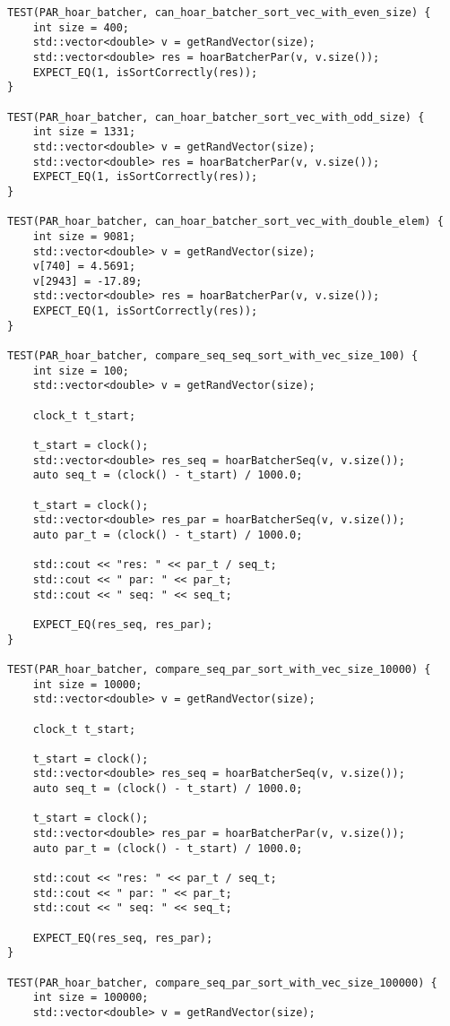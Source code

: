 \documentclass{report}
\begin{document}
\begin{lstlisting}
TEST(PAR_hoar_batcher, can_hoar_batcher_sort_vec_with_even_size) {
    int size = 400;
    std::vector<double> v = getRandVector(size);
    std::vector<double> res = hoarBatcherPar(v, v.size());
    EXPECT_EQ(1, isSortCorrectly(res));
}

TEST(PAR_hoar_batcher, can_hoar_batcher_sort_vec_with_odd_size) {
    int size = 1331;
    std::vector<double> v = getRandVector(size);
    std::vector<double> res = hoarBatcherPar(v, v.size());
    EXPECT_EQ(1, isSortCorrectly(res));
}

TEST(PAR_hoar_batcher, can_hoar_batcher_sort_vec_with_double_elem) {
    int size = 9081;
    std::vector<double> v = getRandVector(size);
    v[740] = 4.5691;
    v[2943] = -17.89;
    std::vector<double> res = hoarBatcherPar(v, v.size());
    EXPECT_EQ(1, isSortCorrectly(res));
}

TEST(PAR_hoar_batcher, compare_seq_seq_sort_with_vec_size_100) {
    int size = 100;
    std::vector<double> v = getRandVector(size);

    clock_t t_start;

    t_start = clock();
    std::vector<double> res_seq = hoarBatcherSeq(v, v.size());
    auto seq_t = (clock() - t_start) / 1000.0;

    t_start = clock();
    std::vector<double> res_par = hoarBatcherSeq(v, v.size());
    auto par_t = (clock() - t_start) / 1000.0;

    std::cout << "res: " << par_t / seq_t;
    std::cout << " par: " << par_t;
    std::cout << " seq: " << seq_t;

    EXPECT_EQ(res_seq, res_par);
}

TEST(PAR_hoar_batcher, compare_seq_par_sort_with_vec_size_10000) {
    int size = 10000;
    std::vector<double> v = getRandVector(size);

    clock_t t_start;

    t_start = clock();
    std::vector<double> res_seq = hoarBatcherSeq(v, v.size());
    auto seq_t = (clock() - t_start) / 1000.0;

    t_start = clock();
    std::vector<double> res_par = hoarBatcherPar(v, v.size());
    auto par_t = (clock() - t_start) / 1000.0;

    std::cout << "res: " << par_t / seq_t;
    std::cout << " par: " << par_t;
    std::cout << " seq: " << seq_t;

    EXPECT_EQ(res_seq, res_par);
}

TEST(PAR_hoar_batcher, compare_seq_par_sort_with_vec_size_100000) {
    int size = 100000;
    std::vector<double> v = getRandVector(size);


\end{lstlisting}
\end{document}
